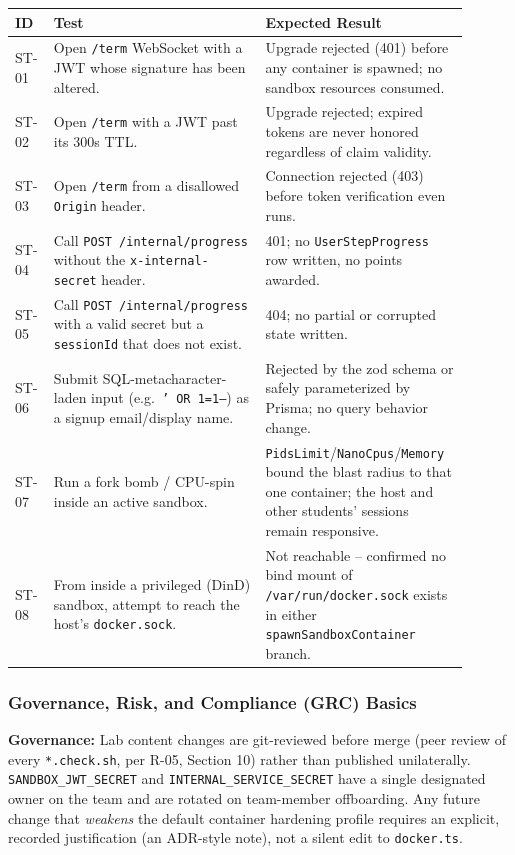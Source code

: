 \documentclass[11pt]{article}
\begin{document}
\begin{longtable}{@{}p{0.08\linewidth}p{0.44\linewidth}p{0.38\linewidth}@{}}
\toprule
\textbf{ID} & \textbf{Test} & \textbf{Expected Result} \\
\midrule
\endhead
ST-01 & Open \texttt{/term} WebSocket with a JWT whose signature has
        been altered. & Upgrade rejected (401) before any container
        is spawned; no sandbox resources consumed. \\
ST-02 & Open \texttt{/term} with a JWT past its 300s TTL. & Upgrade
        rejected; expired tokens are never honored regardless of
        claim validity. \\
ST-03 & Open \texttt{/term} from a disallowed \texttt{Origin} header.
        & Connection rejected (403) before token verification even
        runs. \\
ST-04 & Call \texttt{POST /internal/progress} without the
        \texttt{x-internal-secret} header. & 401; no
        \texttt{UserStepProgress} row written, no points awarded. \\
ST-05 & Call \texttt{POST /internal/progress} with a valid secret but
        a \texttt{sessionId} that does not exist. & 404; no partial
        or corrupted state written. \\
ST-06 & Submit SQL-metacharacter-laden input (e.g.\ \texttt{' OR
        1=1--}) as a signup email/display name. & Rejected by the
        zod schema or safely parameterized by Prisma; no query
        behavior change. \\
ST-07 & Run a fork bomb / CPU-spin inside an active sandbox. &
        \texttt{PidsLimit}/\texttt{NanoCpus}/\texttt{Memory} bound
        the blast radius to that one container; the host and other
        students' sessions remain responsive. \\
ST-08 & From inside a privileged (DinD) sandbox, attempt to reach the
        host's \texttt{docker.sock}. & Not reachable -- confirmed no
        bind mount of \texttt{/var/run/docker.sock} exists in either
        \texttt{spawnSandboxContainer} branch. \\
\bottomrule
\end{longtable}

\subsubsection{Governance, Risk, and Compliance (GRC) Basics}
\textbf{Governance:} Lab content changes are git-reviewed before
merge (peer review of every \texttt{*.check.sh}, per R-05, Section
10) rather than published unilaterally. \texttt{SANDBOX\_JWT\_SECRET}
and \texttt{INTERNAL\_SERVICE\_SECRET} have a single designated owner
on the team and are rotated on team-member offboarding. Any future
change that \emph{weakens} the default container hardening profile
requires an explicit, recorded justification (an ADR-style note),
not a silent edit to \texttt{docker.ts}.
\end{document}
